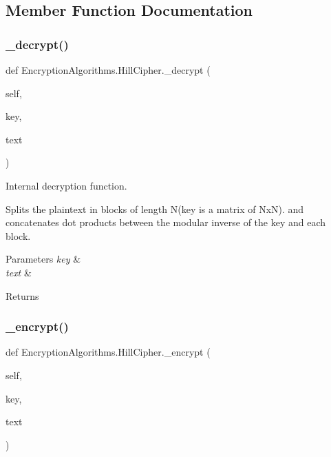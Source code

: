 \subsection{Member Function Documentation}
\mbox{\label{classEncryptionAlgorithms_1_1HillCipher_a35c4b5497e9a1a3e080dd8c4606f0003}} 
\subsubsection{\texorpdfstring{\+\_\+decrypt()}{\_decrypt()}}
{\footnotesize\ttfamily def Encryption\+Algorithms.\+Hill\+Cipher.\+\_\+decrypt (\begin{DoxyParamCaption}\item[{}]{self,  }\item[{}]{key,  }\item[{}]{text }\end{DoxyParamCaption})\hspace{0.3cm}{\ttfamily [private]}}



Internal decryption function. 

Splits the plaintext in blocks of length N(key is a matrix of Nx\+N). and concatenates dot products between the modular inverse of the key and each block.


\begin{DoxyParams}{Parameters}
{\em key} & \\
\hline
{\em text} & \\
\hline
\end{DoxyParams}
\begin{DoxyReturn}{Returns}

\end{DoxyReturn}
\mbox{\label{classEncryptionAlgorithms_1_1HillCipher_a68387a2463c5fc0d3753cf49a3c93d3b}} 
\subsubsection{\texorpdfstring{\+\_\+encrypt()}{\_encrypt()}}
{\footnotesize\ttfamily def Encryption\+Algorithms.\+Hill\+Cipher.\+\_\+encrypt (\begin{DoxyParamCaption}\item[{}]{self,  }\item[{}]{key,  }\item[{}]{text }\end{DoxyParamCaption})\hspace{0.3cm}{\ttfamily [private]}}



